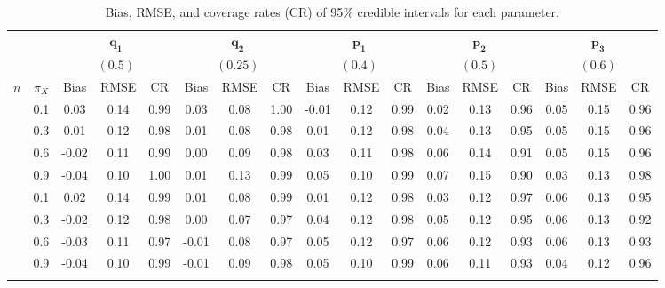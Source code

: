 
\begin{landscape}
\begin{table}
\caption{Bias, RMSE, and coverage rates (CR) of 95\% credible intervals for each parameter.}
\label{tab:sim_res}
\centering
\begin{tabular}[t]{c@{\hskip 1.5em}c@{\hskip 1.5em} ccc@{\hskip 1.25em} ccc@{\hskip 1.25em} ccc@{\hskip 1.25em} ccc@{\hskip 1.25em} ccc}
\toprule
\addlinespace[0.25em]
& & \multicolumn{3}{c}{$\boldsymbol{q_1}$} & \multicolumn{3}{c}{$\boldsymbol{q_2}$} & \multicolumn{3}{c}{$\boldsymbol{p_1}$} & \multicolumn{3}{c}{$\boldsymbol{p_2}$} & \multicolumn{3}{c}{$\boldsymbol{p_3}$} \\
& & \multicolumn{3}{c}{$\boldsymbol{(0.5)}$} & \multicolumn{3}{c}{$\boldsymbol{(0.25)}$} & \multicolumn{3}{c}{$\boldsymbol{(0.4)}$} & \multicolumn{3}{c}{$\boldsymbol{(0.5)}$} & \multicolumn{3}{c}{$\boldsymbol{(0.6)}$} \\
\cmidrule(r){3-5} \cmidrule(r){6-8}  \cmidrule(r){9-11} \cmidrule(r){12-14} \cmidrule(r){15-17}  
$n$ & $\pi_X$ & Bias & RMSE & CR & Bias & RMSE & CR & Bias & RMSE & CR & Bias & RMSE & CR & Bias & RMSE & CR\\
 \midrule
\addlinespace[0.25em]


\multirow{4}{*}{100}  & 0.1 & 0.03 & 0.14 & 0.99 & 0.03 & 0.08 & 1.00 & -0.01 & 0.12 & 0.99 & 0.02 & 0.13 & 0.96 & 0.05 & 0.15 & 0.96\\
& 0.3 & 0.01 & 0.12 & 0.98 & 0.01 & 0.08 & 0.98 & 0.01 & 0.12 & 0.98 & 0.04 & 0.13 & 0.95 & 0.05 & 0.15 & 0.96\\
 & 0.6 & -0.02 & 0.11 & 0.99 & 0.00 & 0.09 & 0.98 & 0.03 & 0.11 & 0.98 & 0.06 & 0.14 & 0.91 & 0.05 & 0.15 & 0.96\\
 & 0.9 & -0.04 & 0.10 & 1.00 & 0.01 & 0.13 & 0.99 & 0.05 & 0.10 & 0.99 & 0.07 & 0.15 & 0.90 & 0.03 & 0.13 & 0.98\\
\addlinespace[0.5em]

\multirow{4}{*}{200}  & 0.1 & 0.02 & 0.14 & 0.99 & 0.01 & 0.08 & 0.99 & 0.01 & 0.12 & 0.98 & 0.03 & 0.12 & 0.97 & 0.06 & 0.13 & 0.95\\
 & 0.3 & -0.02 & 0.12 & 0.98 & 0.00 & 0.07 & 0.97 & 0.04 & 0.12 & 0.98 & 0.05 & 0.12 & 0.95 & 0.06 & 0.13 & 0.92\\
 & 0.6 & -0.03 & 0.11 & 0.97 & -0.01 & 0.08 & 0.97 & 0.05 & 0.12 & 0.97 & 0.06 & 0.12 & 0.93 & 0.06 & 0.13 & 0.93\\
 & 0.9 & -0.04 & 0.10 & 0.99 & -0.01 & 0.09 & 0.98 & 0.05 & 0.10 & 0.99 & 0.06 & 0.11 & 0.93 & 0.04 & 0.12 & 0.96\\
\addlinespace[0.5em]


\end{tabular}
\end{table}
\end{landscape}
